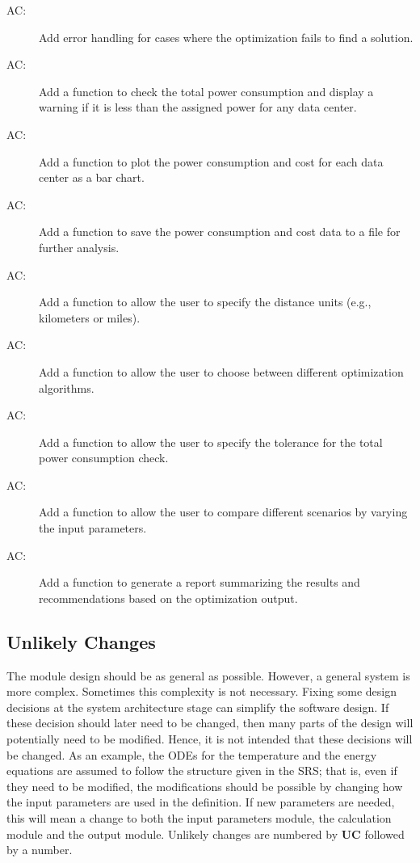 \documentclass[12pt]{article}
\newcounter{acnum}
\newcommand{\actheacnum}{AC\theacnum}
\begin{document}
\begin{description}
\item[ \actheacnum \label{ac5}:] Add error handling for cases where the optimization fails to find a solution.
\item[ \actheacnum \label{ac6}:] Add a function to check the total power consumption and display a warning if it is less than the assigned power for any data center.
\item[ \actheacnum \label{ac7}:] Add a function to plot the power consumption and cost for each data center as a bar chart.
\item[ \actheacnum \label{ac8}:] Add a function to save the power consumption and cost data to a file for further analysis.
\item[ \actheacnum \label{ac9}:] Add a function to allow the user to specify the distance units (e.g., kilometers or miles).
\item[ \actheacnum \label{ac10}:] Add a function to allow the user to choose between different optimization algorithms.
\item[ \actheacnum \label{ac11}:] Add a function to allow the user to specify the tolerance for the total power consumption check.
\item[ \actheacnum \label{ac12}:] Add a function to allow the user to compare different scenarios by varying the input parameters.
\item[ \actheacnum \label{ac13}:] Add a function to generate a report summarizing the results and recommendations based on the optimization output.
\end{description}

\subsection{Unlikely Changes} \label{SecUchange}

The module design should be as general as possible. However, a general system is
more complex. Sometimes this complexity is not necessary. Fixing some design
decisions at the system architecture stage can simplify the software design. If
these decision should later need to be changed, then many parts of the design
will potentially need to be modified. Hence, it is not intended that these
decisions will be changed.  As an example, the ODEs for the temperature and the
energy equations are assumed to follow the structure given in the SRS; that is,
even if they need to be modified, the modifications should be possible by
changing how the input parameters are used in the definition.  If new parameters
are needed, this will mean a change to both the input parameters module, the
calculation module and the output module. Unlikely changes are numbered by \textbf{UC} 
followed by a number.
\end{document}
